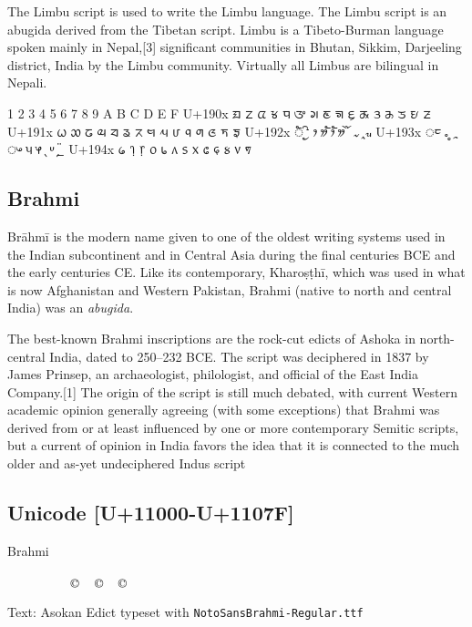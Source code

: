 The Limbu script is used to write the Limbu language. The Limbu script is an abugida derived from the Tibetan script. Limbu is a Tibeto-Burman language spoken mainly in Nepal,[3] significant communities in Bhutan, Sikkim, Darjeeling district, India by the Limbu community. Virtually all Limbus are bilingual in Nepali.

\newfontfamily{}
\bgroup
\obeylines
{}	1	2	3	4	5	6	7	8	9	A	B	C	D	E	F
U+190x	ᤀ	ᤁ	ᤂ	ᤃ	ᤄ	ᤅ	ᤆ	ᤇ	ᤈ	ᤉ	ᤊ	ᤋ	ᤌ	ᤍ	ᤎ	ᤏ
U+191x	ᤐ	ᤑ	ᤒ	ᤓ	ᤔ	ᤕ	ᤖ	ᤗ	ᤘ	ᤙ	ᤚ	ᤛ	ᤜ	ᤝ	ᤞ	
U+192x	ᤠ	ᤡ	ᤢ	ᤣ	ᤤ	ᤥ	ᤦ	ᤧ	ᤨ	ᤩ	ᤪ	ᤫ				
U+193x	ᤰ	ᤱ	ᤲ	ᤳ	ᤴ	ᤵ	ᤶ	ᤷ	ᤸ	᤹	᤺	᤻				
U+194x	᥀				᥄	᥅	᥆	᥇	᥈	᥉	᥊	᥋	᥌	᥍	᥎	᥏
\egroup

\subsection{Brahmi}



Brāhmī is the modern name given to one of the oldest writing systems used in the Indian subcontinent and in Central Asia during the final centuries BCE and the early centuries CE. Like its contemporary, Kharoṣṭhī, which was used in what is now Afghanistan and Western Pakistan, Brahmi (native to north and central India) was an \emph{abugida}.

The best-known Brahmi inscriptions are the rock-cut edicts of Ashoka in north-central India, dated to 250–232 BCE. The script was deciphered in 1837 by James Prinsep, an archaeologist, philologist, and official of the East India Company.[1] The origin of the script is still much debated, with current Western academic opinion generally agreeing (with some exceptions) that Brahmi was derived from or at least influenced by one or more contemporary Semitic scripts, but a current of opinion in India favors the idea that it is connected to the much older and as-yet undeciphered Indus script

\subsection{Unicode [U+11000-U+1107F]}


\newfontfamily{}

\begin{scriptexample}[]{Brahmi}
\bgroup
\raggedleft
\brahmi

         
   

\arial
\hfill Text: Asokan Edict typeset with \texttt{NotoSansBrahmi-Regular.ttf} 
\egroup
\end{scriptexample}